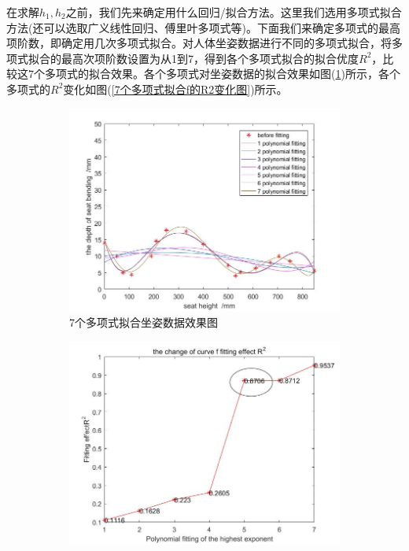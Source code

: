             \par
            在求解$h_1,h_2$之前，我们先来确定用什么回归/拟合方法。这里我们选用多项式拟合方法(还可以选取广义线性回归、傅里叶多项式等)。下面我们来确定多项式的最高项阶数，即确定用几次多项式拟合。对人体坐姿数据进行不同的多项式拟合，将多项式拟合的最高次项阶数设置为从1到7，得到各个多项式拟合的拟合优度$R^2$，比较这7个多项式的拟合效果。各个多项式对坐姿数据的拟合效果如图(\ref{7个多项式拟合坐姿数据效果图})所示，各个多项式的$R^2$变化如图(\ref{7个多项式拟合f的R2变化图})所示。
                \begin{figure}[H]
                    \centering
                    \begin{subfigure}[b]{0.4\textwidth}
                        \includegraphics[width=\textwidth]{images/7polynomial_fit_sitting_data.jpg}
                        \caption{7个多项式拟合坐姿数据效果图}
                        \label{7个多项式拟合坐姿数据效果图}
                    \end{subfigure}
                    \begin{subfigure}[b]{0.4\textwidth}
                        \includegraphics[width=\textwidth]{images/7polynomial_fit_fR2.jpg}

\end{subfigure}
\end{figure}
